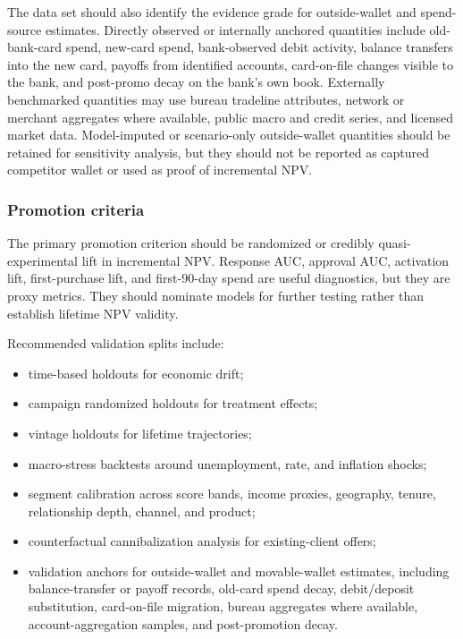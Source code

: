 \documentclass[11pt]{article}
\newcommand{\1}{\mathbf{1}}
\begin{document}
The data set should also identify the evidence grade for outside-wallet and
spend-source estimates. Directly observed or internally anchored quantities
include old-bank-card spend, new-card spend, bank-observed debit activity,
balance transfers into the new card, payoffs from identified accounts,
card-on-file changes visible to the bank, and post-promo decay on the bank's
own book. Externally benchmarked quantities may use bureau tradeline
attributes, network or merchant aggregates where available, public macro and
credit series, and licensed market data. Model-imputed or scenario-only
outside-wallet quantities should be retained for sensitivity analysis, but they
should not be reported as captured competitor wallet or used as proof of
incremental NPV.

\subsubsection{Promotion criteria}

The primary promotion criterion should be randomized or credibly
quasi-experimental lift in incremental NPV. Response AUC, approval AUC,
activation lift, first-purchase lift, and first-90-day spend are useful
diagnostics, but they are proxy metrics. They should nominate models for
further testing rather than establish lifetime NPV validity.

Recommended validation splits include:
\begin{itemize}[leftmargin=*]
  \item time-based holdouts for economic drift;
  \item campaign randomized holdouts for treatment effects;
  \item vintage holdouts for lifetime trajectories;
  \item macro-stress backtests around unemployment, rate, and inflation shocks;
  \item segment calibration across score bands, income proxies, geography,
        tenure, relationship depth, channel, and product;
  \item counterfactual cannibalization analysis for existing-client offers;
  \item validation anchors for outside-wallet and movable-wallet estimates,
        including balance-transfer or payoff records, old-card spend decay,
        debit/deposit substitution, card-on-file migration, bureau aggregates
        where available, account-aggregation samples, and post-promotion decay.
\end{itemize}
\end{document}
